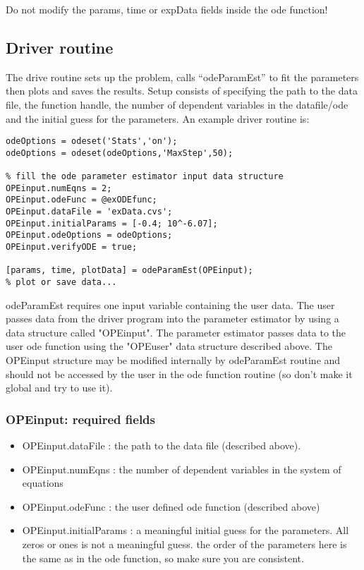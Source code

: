 \documentclass[10pt]{article}
\theoremstyle{plain}
\begin{document}
Do not modify the params, time or expData fields inside the ode function!

\subsection{Driver routine}
The drive routine sets up the problem, calls ``odeParamEst'' to fit
the parameters then plots and saves the results. Setup consists of
specifying the path to the data file, the function handle, the number
of dependent variables in the datafile/ode and the initial guess for
the parameters. An example driver routine is:

\begin{verbatim}
odeOptions = odeset('Stats','on');
odeOptions = odeset(odeOptions,'MaxStep',50);

% fill the ode parameter estimator input data structure
OPEinput.numEqns = 2;
OPEinput.odeFunc = @exODEfunc;
OPEinput.dataFile = 'exData.cvs';
OPEinput.initialParams = [-0.4; 10^-6.07];
OPEinput.odeOptions = odeOptions;
OPEinput.verifyODE = true;

[params, time, plotData] = odeParamEst(OPEinput);
% plot or save data...
\end{verbatim}

odeParamEst requires one input variable containing the user data. The
user passes data from the driver program into the parameter estimator
by using a data structure called "OPEinput". The parameter estimator
passes data to the user ode function using the "OPEuser" data
structure described above. The OPEinput structure may be modified
internally by odeParamEst routine and should not be accessed by the
user in the ode function routine (so don't make it global and try to
use it).

\subsubsection{OPEinput: required fields}
\begin{itemize}
\item OPEinput.dataFile : the path to the data file (described above).

\item OPEinput.numEqns : the number of dependent variables in the system of equations

\item OPEinput.odeFunc : the user defined ode function (described above)

\item OPEinput.initialParams : a meaningful initial guess for the
parameters. All zeros or ones is not a meaningful guess. the order
of the parameters here is the same as in the ode function, so make
sure you are consistent.

\end{itemize}
\end{document}
